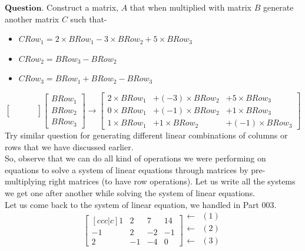 \documentclass{article}
\begin{document}
$\boldsymbol{Question}$. Construct a matrix, $A$ that when multiplied with matrix $B$ generate another matrix $C$ such that-
\begin{itemize}
    \item $CRow_1 = 2\times BRow_1 - 3\times BRow_2 + 5\times BRow_3$
    \item $CRow_2 =  BRow_3 - BRow_2$
    \item $CRow_3 = BRow_1 + BRow_2 - BRow_3$
\end{itemize}
\[
    \begin{bmatrix}
        & & & \\
        & & & \\
        & & &
    \end{bmatrix} \begin{bmatrix}
                        BRow_1\\
                        BRow_2\\
                        BRow_3
                  \end{bmatrix} \longrightarrow \begin{bmatrix}
                                    2\times BRow_1 &+ (-3)\times BRow_2 &+ 5\times BRow_3 \\
                                    0\times BRow_1 &+ (-1)\times BRow_2 &+ 1\times BRow_3\\
                                    
                                    1\times BRow_1 &+ 1\times BRow_2 &+(-1)\times  BRow_3
                                \end{bmatrix}
\]
Try similar question for generating different linear combinations of columns or rows that we have discussed earlier.\\
So, observe that we can do all kind of operations we were performing on equations to solve a system of linear equations through matrices by pre-multiplying right matrices (to have row operations). Let us write all the systems we get one after another while solving the system of linear equations.\\

Let us come back to the system of linear equation, we handled in Part 003.
\[
\begin{bmatrix}[ccc|c]
    1 & 2 & 7 & 14 \\
    -1 & 2 & -2 & -1 \\
    2 & -1 & -4 & 0
\end{bmatrix} \begin{matrix}
                  \longleftarrow & (1) \\  
                  \longleftarrow & (2) \\  
                  \longleftarrow & (3) \\  
              \end{matrix}
\]
\end{document}
